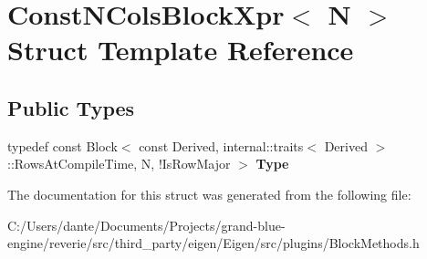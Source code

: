 \hypertarget{struct_const_n_cols_block_xpr}{}\section{Const\+N\+Cols\+Block\+Xpr$<$ N $>$ Struct Template Reference}
\label{struct_const_n_cols_block_xpr}
\subsection*{Public Types}
\begin{DoxyCompactItemize}
\item 
\mbox{\label{struct_const_n_cols_block_xpr_a12a950b35aad45156aeb24eef23dc5d2}} 
typedef const Block$<$ const Derived, internal\+::traits$<$ Derived $>$\+::Rows\+At\+Compile\+Time, N, !Is\+Row\+Major $>$ {\bfseries Type}
\end{DoxyCompactItemize}


The documentation for this struct was generated from the following file\+:\begin{DoxyCompactItemize}
\item 
C\+:/\+Users/dante/\+Documents/\+Projects/grand-\/blue-\/engine/reverie/src/third\+\_\+party/eigen/\+Eigen/src/plugins/Block\+Methods.\+h\end{DoxyCompactItemize}
